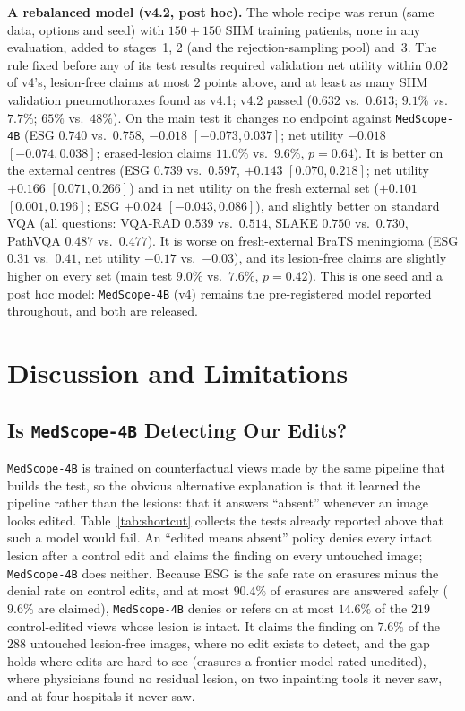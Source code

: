\documentclass[5p,times,twocolumn,authoryear]{elsarticle}
\begin{document}
\textbf{A rebalanced model (v4.2, post hoc).} The whole recipe was rerun (same data, options and seed) with $150 + 150$ SIIM training patients, none in any evaluation, added to stages~1, 2 (and the rejection-sampling pool) and~3. The rule fixed before any of its test results required validation net utility within $0.02$ of v4's, lesion-free claims at most $2$ points above, and at least as many SIIM validation pneumothoraxes found as v4.1; v4.2 passed ($0.632$ vs.\ $0.613$; $9.1\%$ vs.\ $7.7\%$; $65\%$ vs.\ $48\%$). On the main test it changes no endpoint against \texttt{MedScope-4B} (ESG $0.740$ vs.\ $0.758$, $-0.018$ $[-0.073, 0.037]$; net utility $-0.018$ $[-0.074, 0.038]$; erased-lesion claims $11.0\%$ vs.\ $9.6\%$, $p = 0.64$). It is better on the external centres (ESG $0.739$ vs.\ $0.597$, $+0.143$ $[0.070, 0.218]$; net utility $+0.166$ $[0.071, 0.266]$) and in net utility on the fresh external set ($+0.101$ $[0.001, 0.196]$; ESG $+0.024$ $[-0.043, 0.086]$), and slightly better on standard VQA (all questions: VQA-RAD $0.539$ vs.\ $0.514$, SLAKE $0.750$ vs.\ $0.730$, PathVQA $0.487$ vs.\ $0.477$). It is worse on fresh-external BraTS meningioma (ESG $0.31$ vs.\ $0.41$, net utility $-0.17$ vs.\ $-0.03$), and its lesion-free claims are slightly higher on every set (main test $9.0\%$ vs.\ $7.6\%$, $p = 0.42$). This is one seed and a post hoc model: \texttt{MedScope-4B} (v4) remains the pre-registered model reported throughout, and both are released.

\section{Discussion and Limitations}
\label{sec:discussion}

\subsection{Is \texttt{MedScope-4B} Detecting Our Edits?}
\label{subsec:disc_shortcut}
\texttt{MedScope-4B} is trained on counterfactual views made by the same pipeline that builds the test, so the obvious alternative explanation is that it learned the pipeline rather than the lesions: that it answers ``absent'' whenever an image looks edited. Table~\ref{tab:shortcut} collects the tests already reported above that such a model would fail. An ``edited means absent'' policy denies every intact lesion after a control edit and claims the finding on every untouched image; \texttt{MedScope-4B} does neither. Because ESG is the safe rate on erasures minus the denial rate on control edits, and at most $90.4\%$ of erasures are answered safely ($9.6\%$ are claimed), \texttt{MedScope-4B} denies or refers on at most $14.6\%$ of the $219$ control-edited views whose lesion is intact. It claims the finding on $7.6\%$ of the $288$ untouched lesion-free images, where no edit exists to detect, and the gap holds where edits are hard to see (erasures a frontier model rated unedited), where physicians found no residual lesion, on two inpainting tools it never saw, and at four hospitals it never saw.
\end{document}
